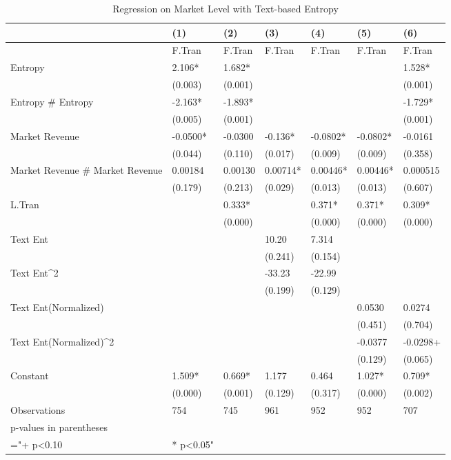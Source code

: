 \begin{table}
\centering
\begin{tabular}{@{}lllllll@{}}
\toprule
 & (1) & (2) & (3) & (4) & (5) & (6) \\ \midrule
 & F.Tran & F.Tran & F.Tran & F.Tran & F.Tran & F.Tran \\
Entropy & 2.106* & 1.682* &  &  &  & 1.528* \\
 & (0.003) & (0.001) &  &  &  & (0.001) \\
Entropy \# Entropy & -2.163* & -1.893* &  &  &  & -1.729* \\
 & (0.005) & (0.001) &  &  &  & (0.001) \\
Market Revenue & -0.0500* & -0.0300 & -0.136* & -0.0802* & -0.0802* & -0.0161 \\
 & (0.044) & (0.110) & (0.017) & (0.009) & (0.009) & (0.358) \\
Market Revenue \# Market Revenue & 0.00184 & 0.00130 & 0.00714* & 0.00446* & 0.00446* & 0.000515 \\
 & (0.179) & (0.213) & (0.029) & (0.013) & (0.013) & (0.607) \\
L.Tran &  & 0.333* &  & 0.371* & 0.371* & 0.309* \\
 &  & (0.000) &  & (0.000) & (0.000) & (0.000) \\
Text Ent &  &  & 10.20 & 7.314 &  &  \\
 &  &  & (0.241) & (0.154) &  &  \\
Text Ent\textasciicircum{}2 &  &  & -33.23 & -22.99 &  &  \\
 &  &  & (0.199) & (0.129) &  &  \\
Text Ent(Normalized) &  &  &  &  & 0.0530 & 0.0274 \\
 &  &  &  &  & (0.451) & (0.704) \\
Text Ent(Normalized)\textasciicircum{}2 &  &  &  &  & -0.0377 & -0.0298+ \\
 &  &  &  &  & (0.129) & (0.065) \\
Constant & 1.509* & 0.669* & 1.177 & 0.464 & 1.027* & 0.709* \\
 & (0.000) & (0.001) & (0.129) & (0.317) & (0.000) & (0.002) \\
Observations & 754 & 745 & 961 & 952 & 952 & 707 \\
p-values in parentheses &  &  &  &  &  &  \\
="+ p\textless{}0.10 & * p\textless{}0.05" &  &  &  &  &  \\ \bottomrule
\end{tabular}
\caption{Regression on Market Level with Text-based Entropy}
\label{reg_mkt_text_ent}
\end{table}